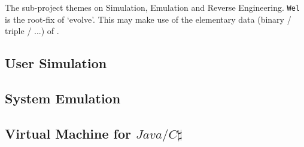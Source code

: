 The sub-project themes on Simulation, Emulation and Reverse Engineering. \verb|Wel| is the root-fix of `evolve'. This may make use of the elementary data (binary / triple / ...) of .



\subsection{User Simulation}



\subsection{System Emulation}



\subsection{Virtual Machine for $Java/C\sharp$}

